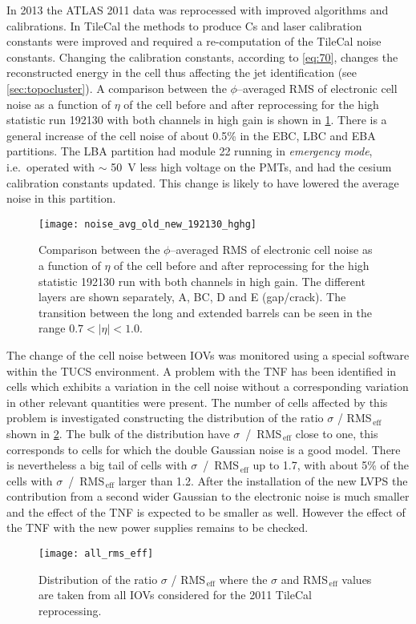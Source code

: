 In 2013 the ATLAS 2011 data was reprocessed with improved algorithms and
calibrations. In TileCal the methods to produce Cs and laser calibration
constants were improved and required a re-computation of the TileCal noise
constants. Changing the calibration constants, according to \cref{eq:70},
changes the reconstructed energy in the cell thus affecting the jet
identification (see \cref{sec:topocluster}). A comparison between the
$\phi$--averaged RMS of electronic cell noise as a function of $\eta$ of the
cell before and after reprocessing for the high statistic run 192130 with both
channels in high gain is shown in \cref{fig:noise_avg_old_new_hghg}. There is a
general increase of the cell noise of about 0.5\% in the EBC, LBC and EBA
partitions. The LBA partition had module 22 running in \emph{emergency mode},
i.e.\ operated with $\sim$ 50~V less high voltage on the PMTs, and had the
cesium calibration constants updated. This change is likely to have lowered the
average noise in this partition.

\begin{figure}[!h]
  \centering
    \texttt{[image: noise\_avg\_old\_new\_192130\_hghg]}
    \caption{Comparison between the $\phi$--averaged RMS of electronic cell
      noise as a function of $\eta$ of the cell before and after reprocessing
      for the high statistic 192130 run with both channels in high gain. The
      different layers are shown separately, A, BC, D and E (gap/crack). The
      transition between the long and extended barrels can be seen in the range
      $0.7 < |\eta| < 1.0$.}
    \label{fig:noise_avg_old_new_hghg}
\end{figure}

The change of the cell noise between IOVs was monitored using a special software
within the TUCS environment. A problem with the TNF has been identified in cells
which exhibits a variation in the cell noise without a corresponding variation
in other relevant quantities were present. The number of cells affected by this
problem is investigated constructing the distribution of the ratio $\sigma$ /
RMS$_\mathrm{\, eff}$ shown in \cref{fig:all_rms_eff}. The bulk of the
distribution have $\sigma$~/~RMS$_\mathrm{\, eff}$ close to one, this
corresponds to cells for which the double Gaussian noise is a good model. There
is nevertheless a big tail of cells with $\sigma$~/~RMS$_\mathrm{\, eff}$ up to
1.7, with about 5\% of the cells with $\sigma$~/~RMS$_\mathrm{\, eff}$ larger
than 1.2. After the installation of the new LVPS the contribution from a second
wider Gaussian to the electronic noise is much smaller and the effect of the TNF
is expected to be smaller as well. However the effect of the TNF with the new
power supplies remains to be checked.
\begin{figure}[!h]
  \centering
    \texttt{[image: all\_rms\_eff]}
    \caption{Distribution of the ratio $\sigma$ / RMS$_\mathrm{\, eff}$ where the
      $\sigma$ and RMS$_\mathrm{\, eff}$ values are taken from all IOVs
      considered for the 2011 TileCal reprocessing.}
    \label{fig:all_rms_eff}
\end{figure}
